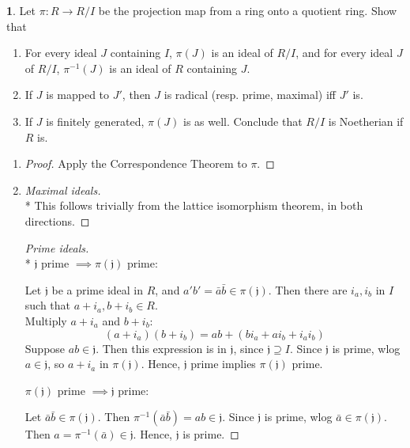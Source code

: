\documentclass{book}
\newcommand{\fr}[1]{\mathfrak #1}
\theoremstyle{definition}
\theoremstyle{block}
\newtheorem{block*}[block]{}
\theoremstyle{thm}
\begin{document}
\begin{block*}Let $\pi:R\to R/I$ be the projection map from a ring onto a
  quotient ring. Show that
  \begin{enumerate}[label=(\alph*)]
    \item For every ideal $J$ containing $I$, $\pi(J)$ is an ideal of $R/I$, and
      for every ideal $J$ of $R/I$, $\pi^{-1}(J)$ is an ideal of $R$ containing
      $J$.
    \item If $J$ is mapped to $J'$, then $J$ is radical (resp. prime, maximal)
      iff $J'$ is.
    \item If $J$ is finitely generated, $\pi(J)$ is as well. Conclude that $R/I$ is
      Noetherian if $R$ is.
  \end{enumerate}
\end{block*}
  \hfill
  \begin{enumerate}[label=(\alph*)]
    \item 
      \begin{proof}
        Apply the Correspondence Theorem to $\pi$.
      \end{proof}
    \item 
      \begin{proof}[Maximal ideals]\mbox{}\\* 
        This follows trivially from the lattice
        isomorphism theorem, in both directions.
      \end{proof}
      \begin{proof}[Prime ideals]\mbox{}\\*    
        $\fr j$ prime $\implies\pi(\fr j)$ prime:\par 
        Let $\fr j$ be a prime ideal in $R$, and $a'b' =
        \bar{a}\bar{b} \in \pi(\fr j)$. Then there are $i_a,i_b$ in $I$ 
        such that $a+i_a,b+i_b\in R$.\\
        Multiply $a+i_a$ and $b+i_b$:
        \[(a+i_a)(b+i_b) = ab + (bi_a+ai_b+i_ai_b)\]
        Suppose $ab\in\fr j$. Then this expression is in $\fr j$, since 
        $\fr j\supseteq I$. Since $\fr j$ is prime, wlog $a\in\fr j$, so 
        $a+i_a$ in $\pi(\fr j)$. Hence, $\fr j$ prime implies $\pi(\fr j)$ 
        prime.\par
        $\pi(\fr j)$ prime $\implies \fr j$ prime:\par
        Let $\bar a\bar b\in\pi(\fr j)$. Then $\pi^{-1}(\bar a\bar b) 
        = ab\in\fr j$. Since $\fr j$ is prime, wlog $\bar a\in\pi(\fr j)$. 
        Then $a=\pi^{-1}(\bar a) \in\fr j$. Hence, $\fr j$ is prime.
      \end{proof}

\end{enumerate}
\end{document}

